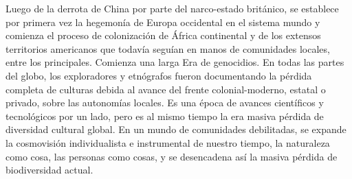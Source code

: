 \documentclass[a4paper,11pt]{book}
\theoremstyle{definition}
\begin{document}
%
Luego de la derrota de China por parte del narco-estado brit\'anico, se establece por primera vez la hegemon\'ia de Europa occidental en el sistema mundo y comienza el proceso de colonizaci\'on de \'Africa continental y de los extensos territorios americanos que todav\'ia segu\'ian en manos de comunidades locales, entre los principales.
%
Comienza una larga Era de genocidios.
%
En todas las partes del globo, los exploradores y etn\'ografos fueron documentando la p\'erdida completa de culturas debida al avance del frente colonial-moderno, estatal o privado, sobre las autonom\'ias locales.
Es una \'epoca de avances cient\'ificos y tecnol\'ogicos por un lado, pero es al mismo tiempo la era masiva p\'erdida de diversidad cultural global.
%
%
%
En un mundo de comunidades debilitadas, se expande la cosmovisi\'on individualista e instrumental de nuestro tiempo, la naturaleza como cosa, las personas como cosas, y se desencadena as\'i la masiva p\'erdida de biodiversidad actual.

\end{document}
